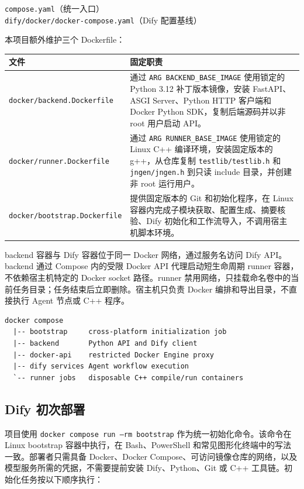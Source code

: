 \documentclass[UTF8,zihao=-4]{ctexart}
\begin{document}
\begin{center}
\texttt{compose.yaml}\quad（统一入口）\\
\texttt{dify/docker/docker-compose.yaml}\quad（Dify 配置基线）
\end{center}

本项目额外维护三个 Dockerfile：

\begin{longtable}{p{4.4cm}p{9.4cm}}
\toprule
文件 & 固定职责 \\
\midrule
\texttt{docker/}\newline\texttt{backend.Dockerfile} & 通过 \texttt{ARG BACKEND\_BASE\_IMAGE} 使用锁定的 Python 3.12 补丁版本镜像，安装 FastAPI、ASGI Server、Python HTTP 客户端和 Docker Python SDK，复制后端源码并以非 root 用户启动 API。 \\
\texttt{docker/}\newline\texttt{runner.Dockerfile} & 通过 \texttt{ARG RUNNER\_BASE\_IMAGE} 使用锁定的 Linux C++ 编译环境，安装固定版本的 g++，从仓库复制 \texttt{testlib/testlib.h} 和 \texttt{jngen/jngen.h} 到只读 include 目录，并创建非 root 运行用户。 \\
\texttt{docker/}\newline\texttt{bootstrap.Dockerfile} & 提供固定版本的 Git 和初始化程序，在 Linux 容器内完成子模块获取、配置生成、摘要核验、Dify 初始化和工作流导入，不调用宿主机脚本环境。 \\
\bottomrule
\end{longtable}

backend 容器与 Dify 容器位于同一 Docker 网络，通过服务名访问 Dify API。backend 通过 Compose 内的受限 Docker API 代理启动短生命周期 runner 容器，不依赖宿主机特定的 Docker socket 路径。runner 禁用网络，只挂载命名卷中的当前任务目录；任务结束后立即删除。宿主机只负责 Docker 编排和导出目录，不直接执行 Agent 节点或 C++ 程序。

\begin{lstlisting}
docker compose
  |-- bootstrap     cross-platform initialization job
  |-- backend       Python API and Dify client
  |-- docker-api    restricted Docker Engine proxy
  |-- dify services Agent workflow execution
  `-- runner jobs   disposable C++ compile/run containers
\end{lstlisting}

\subsection{Dify 初次部署}

项目使用 \texttt{docker compose run --rm bootstrap} 作为统一初始化命令。该命令在 Linux bootstrap 容器中执行，在 Bash、PowerShell 和常见图形化终端中的写法一致。部署者只需具备 Docker、Docker Compose、可访问镜像仓库的网络，以及模型服务所需的凭据，不需要提前安装 Dify、Python、Git 或 C++ 工具链。初始化任务按以下顺序执行：
\end{document}
